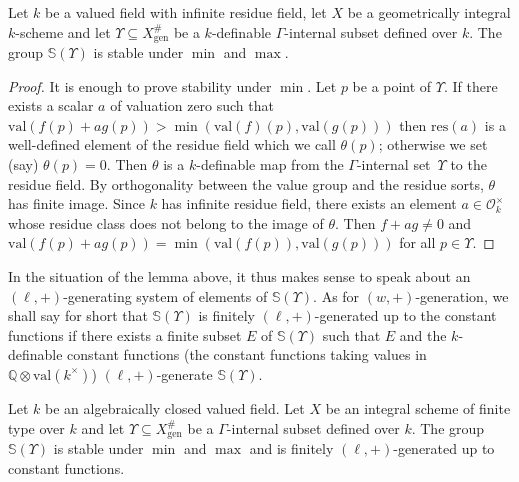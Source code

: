 \documentclass[JEP,XML,SOM,Unicode,ThmDefs,NoEqCountersInSection,published]{cedram}
\newcommand{\val}{\mathrm{val}}
\newcommand{\Q}{\mathbb Q}
\renewcommand{\SS}{\mathbb S}
\let\subset\subseteq
\theoremstyle{plain}
\theoremstyle{definition}
\begin{document}
\begin{lemm}\label{lem-stable-min}
Let $k$ be a valued field with infinite residue field, let $X$ be a geometrically integral $k$-scheme and let
$\Upsilon\subset X^\#
_{\mathrm{gen}}$ be a $k$-definable $\Gamma$-internal subset defined
over $k$. The group $\SS(\Upsilon)$ is stable under $\min$ and $\max$.
\end{lemm}

\begin{proof}
It is enough to prove stability under $\min$. Let $p$ be a point of $\Upsilon$. If there exists a scalar $a$ of valuation zero such that
$\val(f(p)+ag(p))>\min(\val (f)(p), \val (g(p)))$ then $\mathrm{res}(a)$ is a well-defined element of the residue field
which we call $\theta(p)$; otherwise we set (say) $\theta(p)=0$.
Then $\theta$ is a $k$-definable map from the $\Gamma$-internal set~$\Upsilon$ to the residue field.
By orthogonality between the value group and the residue sorts, $\theta$ has finite image. Since $k$ has infinite residue field,
there exists an element $a\in\mathscr O_k^\times$ whose residue class does not belong to the image of $\theta$.
Then $f+ag\neq 0$ and $\val(f(p)+ag(p))=\min (\val (f(p)), \val (g(p)))$ for all $p\in \Upsilon$.
\end{proof}

In the situation of the lemma above, it thus makes sense to speak about
an $(\ell,+)$-generating system of elements of $\SS(\Upsilon)$. As for $(w,+)$-generation, we shall say for short that $\SS(\Upsilon)$
is finitely $(\ell,+)$-generated up to the constant functions if
there exists a finite subset $E$ of $\SS(\Upsilon)$ such that $E$ and the $k$-definable constant functions (\ie the constant functions taking values in $\Q\otimes \val(k^\times)$) $(\ell,+)$-generate $\SS(\Upsilon)$.

\begin{theo}\label{themaintheorem}
Let $k$ be
an algebraically closed valued field. Let $X$ be an integral scheme of finite type over $k$ and let $\Upsilon\subseteq X^\#_{\mathrm{gen}}$ be a $\Gamma$-internal
subset defined over $k$.
The group $\SS(\Upsilon)$
is stable under $\min$ and $\max$ and
is finitely $(\ell,+)$-generated up to constant functions.
\end{theo}
\end{document}
